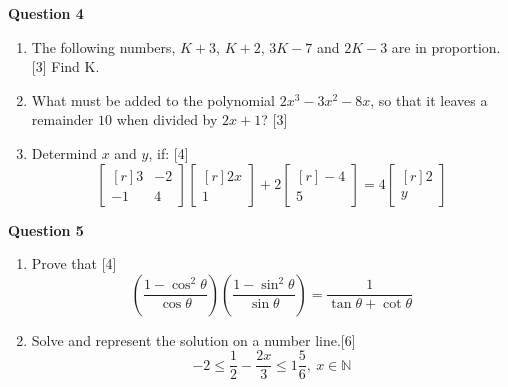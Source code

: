 \noindent
\textbf{Question 4}
\begin{enumerate}[label=(\roman*)]

    \item The following numbers, $K+3$, $K+2$, $3K - 7$ and $2K-3$ are 
        in proportion. \hfill [3]
        Find K.

    \item What must be added to the polynomial $2x^3 - 3x^2 -8x$, so that
        it leaves a remainder $10$ when divided by $2x+1$? \hfill [3]

    \item Determind $x$ and $y$, if: \hfill [4]
        \[
            \begin{bmatrix*}[r] 3 & -2 \\ -1 & 4 \end{bmatrix*}
            \begin{bmatrix*}[r] 2x \\ 1 \end{bmatrix*} + 
            2 \begin{bmatrix*}[r] -4 \\ 5 \end{bmatrix*} = 
            4 \begin{bmatrix*}[r] 2 \\ y \end{bmatrix*}
        \]

\end{enumerate}

\noindent
\textbf{Question 5}
\begin{enumerate}[label=(\roman*)]

    \item Prove that \hfill [4]
        \[
            \left( \frac{1 - \cos^2 \theta}{\cos \theta} \right)
            \left( \frac{1 - \sin^2 \theta}{\sin \theta} \right) =
            \frac{1}{\tan \theta + \cot \theta}
        \]

    \item Solve and represent the solution on a number line.\hfill [6]
        \[
            -2 \leq \frac12 - \frac{2x}{3} \leq 1\frac56, \ x \in \mathbb{N}
        \]

\end{enumerate}


